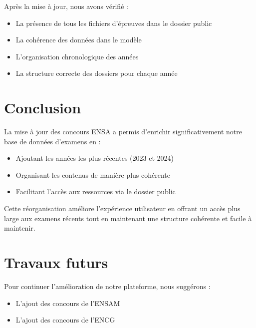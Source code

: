 \documentclass[12pt,a4paper]{article}
\begin{document}
Après la mise à jour, nous avons vérifié :
\begin{itemize}
    \item La présence de tous les fichiers d'épreuves dans le dossier public
    \item La cohérence des données dans le modèle
    \item L'organisation chronologique des années
    \item La structure correcte des dossiers pour chaque année
\end{itemize}

\section{Conclusion}

La mise à jour des concours ENSA a permis d'enrichir significativement notre base de données d'examens en :
\begin{itemize}
    \item Ajoutant les années les plus récentes (2023 et 2024)
    \item Organisant les contenus de manière plus cohérente
    \item Facilitant l'accès aux ressources via le dossier public
\end{itemize}

Cette réorganisation améliore l'expérience utilisateur en offrant un accès plus large aux examens récents tout en maintenant une structure cohérente et facile à maintenir.

\section{Travaux futurs}

Pour continuer l'amélioration de notre plateforme, nous suggérons :
\begin{itemize}
    \item L'ajout des concours de l'ENSAM 
    \item L'ajout des concours de l'ENCG 
\end{itemize}
\end{document}
